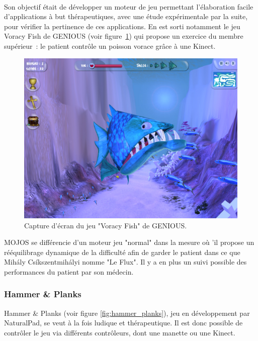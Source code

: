 \paragraph{}
Son objectif était de développer un moteur de jeu permettant 
l'élaboration facile d'applications à but thérapeutiques, avec une étude 
expérimentale
par la suite, pour vérifier la pertinence de ces applications. En est sorti 
notamment le jeu Voracy Fish de GENIOUS (voir figure~\ref{fig:voracy_fish})
qui propose un exercice du membre supérieur~: le patient contrôle un poisson 
vorace grâce à une Kinect.

\begin{figure}[h!]
\centering
\includegraphics[width=0.8\linewidth]{images/voracy_fish}
\caption{Capture d'écran du jeu "Voracy Fish" de GENIOUS.}
\label{fig:voracy_fish}
\end{figure}

MOJOS se différencie d'un moteur jeu "normal" dans la mesure où 'il propose
un rééquilibrage dynamique de la difficulté afin de garder le patient dans
ce que Mihály Csíkszentmihályi nomme "Le Flux"\cite{flow}. Il y a en plus un suivi possible 
des performances du patient par son médecin.

\subsubsection{Hammer \& Planks}
Hammer \& Planks (voir figure \ref{fig:hammer_planks}), jeu en développement par NaturalPad, se veut à la fois 
ludique et thérapeutique. Il est donc possible de contrôler le jeu via différents contrôleurs, dont une manette ou une Kinect.

